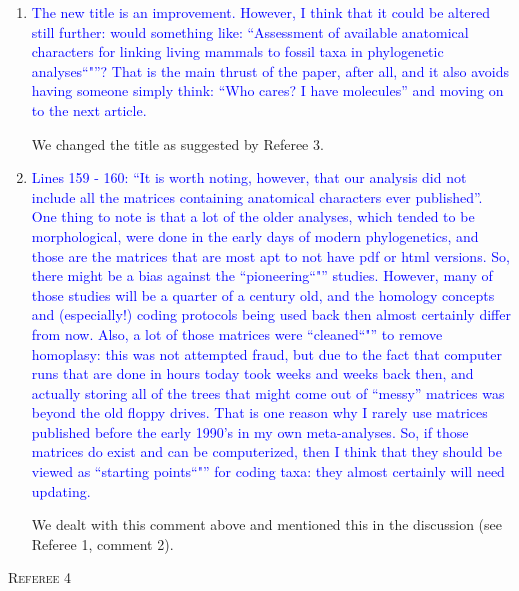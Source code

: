 \documentclass[12pt,letterpaper]{article}
\renewcommand{\section}[1]{%
\bigskip
\begin{center}
\begin{Large}
\normalfont\scshape #1
\medskip
\end{Large}
\end{center}}
\begin{document}
\begin{enumerate}
\item{\textcolor{blue}{The new title is an improvement.  However, I think that it could be altered still further: would something like: ``Assessment of available anatomical characters for linking living mammals to fossil taxa in phylogenetic analyses``"''?  That is the main thrust of the paper, after all, and it also avoids having someone simply think: ``Who cares? I have molecules'' and moving on to the next article.}}

We changed the title as suggested by Referee 3.

\item{\textcolor{blue}{Lines 159 - 160: ``It is worth noting, however, that our analysis did not include all the matrices containing anatomical characters ever published''.
One thing to note is that a lot of the older analyses, which tended to be morphological, were done in the early days of modern phylogenetics, and those are the matrices that are most apt to not have pdf or html versions.  So, there might be a bias against the ``pioneering``"'' studies.  However, many of those studies will be a quarter of a century old, and the homology concepts and (especially!) coding protocols being used back then almost certainly differ from now.  Also, a lot of those matrices were ``cleaned``"'' to remove homoplasy: this was not attempted fraud, but due to the fact that computer runs that are done in hours today took weeks and weeks back then, and actually storing all of the trees that might come out of ``messy'' matrices was beyond the old floppy drives.  That is one reason why I rarely use matrices published before the early 1990's in my own meta-analyses.  So, if those matrices do exist and can be computerized, then I think that they should be viewed as ``starting points``"'' for coding taxa: they almost certainly will need updating.}}

We dealt with this comment above and mentioned this in the discussion (see Referee 1, comment 2).

\end{enumerate}

\section{Referee 4}
\end{document}
